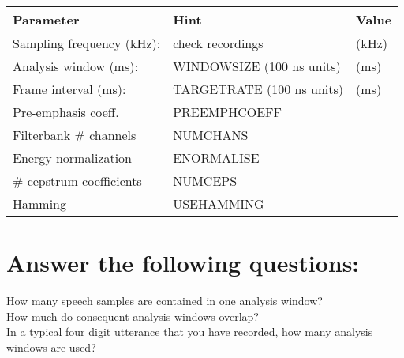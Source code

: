 \documentclass[onecolumn]{article}
\begin{document}
\begin{tabular}{|l|l|l|}
\hline
Parameter & Hint & Value \\ \hline
Sampling frequency (kHz): & check recordings & \hfill (kHz) \\
Analysis window (ms):     & WINDOWSIZE (100 ns units) & \hfill (ms) \\
Frame interval (ms):      & TARGETRATE (100 ns units) & \hfill (ms) \\
Pre-emphasis coeff.       & PREEMPHCOEFF              &    \\
Filterbank \# channels    & NUMCHANS                  &    \\
Energy normalization      & ENORMALISE                &    \\
\# cepstrum coefficients  & NUMCEPS                   &    \\
Hamming                   & USEHAMMING                &    \\
\hline
\end{tabular}

\section*{Answer the following questions:}
How many speech samples are contained in one analysis window?\\[7mm]
How much do consequent analysis windows overlap?\\[7mm]
In a typical four digit utterance that you have recorded, how many analysis windows are used?\\[1mm]
\end{document}
